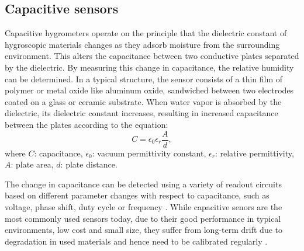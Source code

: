 \subsection{Capacitive sensors}\label{s:capacitive_sensors}
Capacitive hygrometers operate on the principle that the dielectric constant of hygroscopic materials changes as they adsorb moisture from the surrounding environment. This alters the capacitance between two conductive plates separated by the dielectric. By measuring this change in capacitance, the relative humidity can be determined. In a typical structure, the sensor consists of a thin film of polymer or metal oxide like aluminum oxide, sandwiched between two electrodes coated on a glass or ceramic substrate. When water vapor is absorbed by the dielectric, its dielectric constant increases, resulting in increased capacitance between the plates according to the equation:
\begin{equation}
    C = \epsilon_0 \epsilon_r \frac{A}{d},
\end{equation}
where $C$: capacitance, $\epsilon_0$: vacuum permittivity constant, $\epsilon_r$: relative permittivity, $A$: plate area, $d$: plate distance.

The change in capacitance can be detected using a variety of readout circuits based on different parameter changes with respect to capacitance, such as voltage, phase shift, duty cycle or frequency \autocite{hafizi-mooriCapacitanceReadoutCircuits2016}. While capacitive senors are the most commonly used sensors today, due to their good performance in typical environments, low cost and small size, they suffer from long-term drift due to degradation in used materials and hence need to be calibrated regularly \autocite{chenHumiditySensorsReview2005,korotcenkovHandbookHumidityMeasurement2019}.

